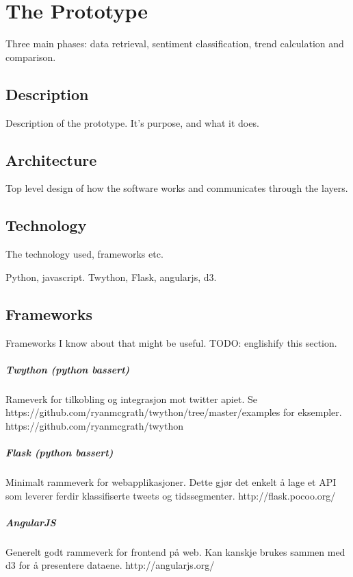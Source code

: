 \chapter{The Prototype}

Three main phases: data retrieval, sentiment classification, trend calculation
and comparison.
\section{Description}
Description of the prototype. It's purpose, and what it does. 

\section{Architecture}
Top level design of how the software works and communicates through the layers.
\section{Technology}
The technology used, frameworks etc.

Python, javascript.
Twython, Flask, angularjs, d3.

\section{Frameworks}
Frameworks I know about that might be useful.
TODO: englishify this section. 

\paragraph{Twython (python bassert)}
Rameverk for tilkobling og integrasjon mot twitter apiet.
Se https://github.com/ryanmcgrath/twython/tree/master/examples for eksempler.
https://github.com/ryanmcgrath/twython

\paragraph{Flask (python bassert)}
Minimalt rammeverk for webapplikasjoner. Dette gjør det enkelt å lage et API som
leverer ferdir klassifiserte tweets og tidssegmenter.
http://flask.pocoo.org/

\paragraph{AngularJS}
Generelt godt rammeverk for frontend på web. Kan kanskje brukes sammen med d3
for å presentere dataene.
http://angularjs.org/

